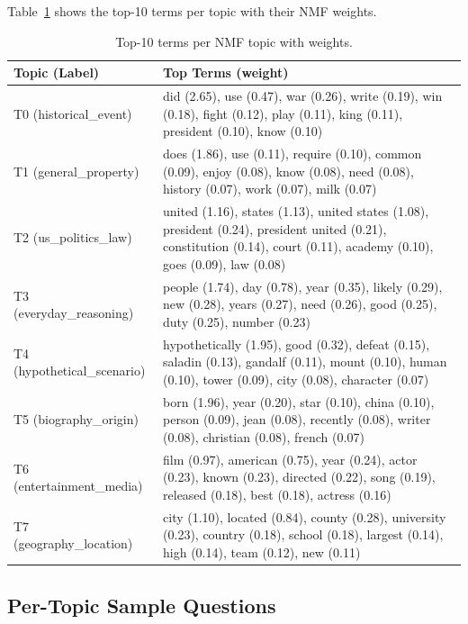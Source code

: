 \documentclass{article}
\begin{document}
Table~\ref{tab:topic_terms} shows the top-10 terms per topic with their
NMF weights.

\begin{table}[h]
\centering
\caption{Top-10 terms per NMF topic with weights.}
\label{tab:topic_terms}
\small
\setlength{\tabcolsep}{3pt}
\begin{tabular}{@{}lp{11cm}@{}}
\toprule
\textbf{Topic (Label)} & \textbf{Top Terms (weight)} \\
\midrule
T0 (historical\_event) & did (2.65), use (0.47), war (0.26), write (0.19), win (0.18), fight (0.12), play (0.11), king (0.11), president (0.10), know (0.10) \\[3pt]
T1 (general\_property) & does (1.86), use (0.11), require (0.10), common (0.09), enjoy (0.08), know (0.08), need (0.08), history (0.07), work (0.07), milk (0.07) \\[3pt]
T2 (us\_politics\_law) & united (1.16), states (1.13), united states (1.08), president (0.24), president united (0.21), constitution (0.14), court (0.11), academy (0.10), goes (0.09), law (0.08) \\[3pt]
T3 (everyday\_reasoning) & people (1.74), day (0.78), year (0.35), likely (0.29), new (0.28), years (0.27), need (0.26), good (0.25), duty (0.25), number (0.23) \\[3pt]
T4 (hypothetical\_scenario) & hypothetically (1.95), good (0.32), defeat (0.15), saladin (0.13), gandalf (0.11), mount (0.10), human (0.10), tower (0.09), city (0.08), character (0.07) \\[3pt]
T5 (biography\_origin) & born (1.96), year (0.20), star (0.10), china (0.10), person (0.09), jean (0.08), recently (0.08), writer (0.08), christian (0.08), french (0.07) \\[3pt]
T6 (entertainment\_media) & film (0.97), american (0.75), year (0.24), actor (0.23), known (0.23), directed (0.22), song (0.19), released (0.18), best (0.18), actress (0.16) \\[3pt]
T7 (geography\_location) & city (1.10), located (0.84), county (0.28), university (0.23), country (0.18), school (0.18), largest (0.14), high (0.14), team (0.12), new (0.11) \\
\bottomrule
\end{tabular}
\end{table}

\subsection{Per-Topic Sample Questions}
\end{document}
